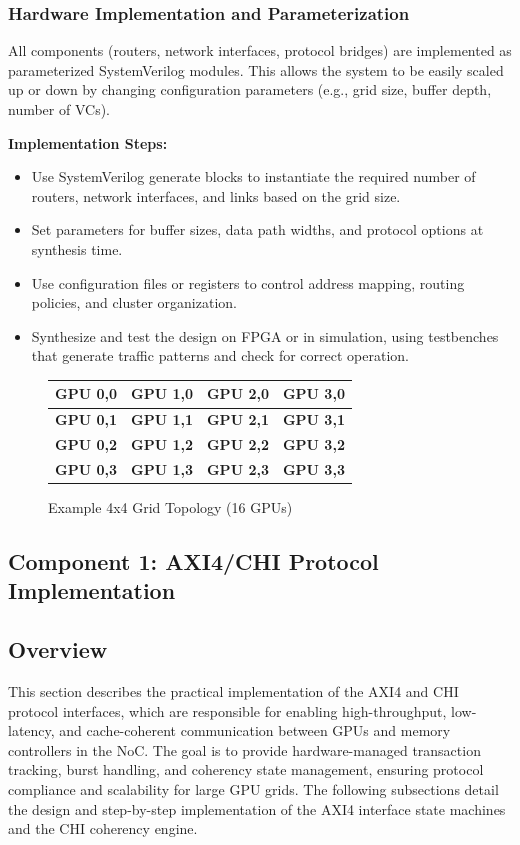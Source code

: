 \documentclass[11pt,a4paper]{article}
\begin{document}
\subsubsection{Hardware Implementation and Parameterization}
All components (routers, network interfaces, protocol bridges) are implemented as parameterized SystemVerilog modules. This allows the system to be easily scaled up or down by changing configuration parameters (e.g., grid size, buffer depth, number of VCs).

\textbf{Implementation Steps:}
\begin{itemize}
    \item Use SystemVerilog generate blocks to instantiate the required number of routers, network interfaces, and links based on the grid size.
    \item Set parameters for buffer sizes, data path widths, and protocol options at synthesis time.
    \item Use configuration files or registers to control address mapping, routing policies, and cluster organization.
    \item Synthesize and test the design on FPGA or in simulation, using testbenches that generate traffic patterns and check for correct operation.
\end{itemize}

\begin{figure}[H]
    \centering
    \begin{tabular}{|c|c|c|c|}
        \hline
        \textbf{GPU 0,0} & \textbf{GPU 1,0} & \textbf{GPU 2,0} & \textbf{GPU 3,0} \\
        \hline
        \textbf{GPU 0,1} & \textbf{GPU 1,1} & \textbf{GPU 2,1} & \textbf{GPU 3,1} \\
        \hline
        \textbf{GPU 0,2} & \textbf{GPU 1,2} & \textbf{GPU 2,2} & \textbf{GPU 3,2} \\
        \hline
        \textbf{GPU 0,3} & \textbf{GPU 1,3} & \textbf{GPU 2,3} & \textbf{GPU 3,3} \\
        \hline
    \end{tabular}
    \caption{Example 4x4 Grid Topology (16 GPUs)}
\end{figure}

\subsection{Component 1: AXI4/CHI Protocol Implementation}

\subsection*{Overview}
This section describes the practical implementation of the AXI4 and CHI protocol interfaces, which are responsible for enabling high-throughput, low-latency, and cache-coherent communication between GPUs and memory controllers in the NoC. The goal is to provide hardware-managed transaction tracking, burst handling, and coherency state management, ensuring protocol compliance and scalability for large GPU grids. The following subsections detail the design and step-by-step implementation of the AXI4 interface state machines and the CHI coherency engine.
\end{document}
